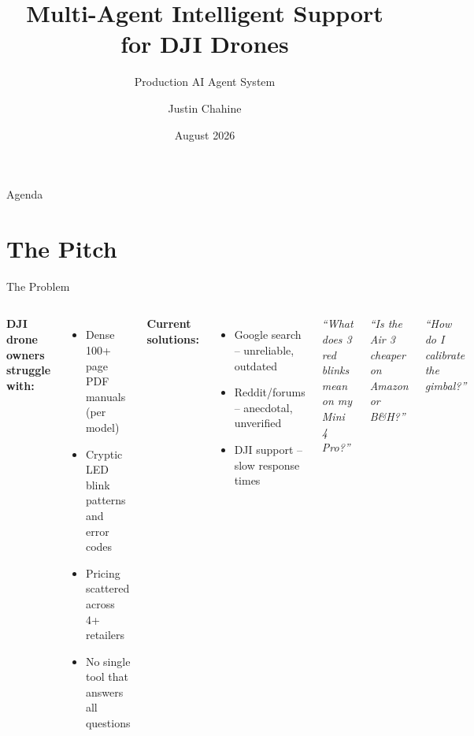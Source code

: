 \documentclass[aspectratio=169]{beamer}
\title[DJI Drone AI Assistant]{\textbf{Multi-Agent Intelligent Support\\for DJI Drones}}
\subtitle{Production AI Agent System}
\author{Justin Chahine}
\institute{InMind AI Program}
\date{August 2026}
\begin{document}
\begin{frame}
\titlepage
\end{frame}

\begin{frame}{Agenda}
\tableofcontents
\end{frame}

\section{The Pitch}

\begin{frame}{The Problem}
\begin{columns}
\textbf{DJI drone owners struggle with:}
\begin{itemize}
  \item Dense 100+ page PDF manuals (per model)
  \item Cryptic LED blink patterns and error codes
  \item Pricing scattered across 4+ retailers
  \item No single tool that answers all questions
\end{itemize}

\vspace{1em}
\textbf{Current solutions:}
\begin{itemize}
  \item Google search -- unreliable, outdated
  \item Reddit/forums -- anecdotal, unverified
  \item DJI support -- slow response times
\end{itemize}

\centering
\vspace{1em}

\small
\textit{``What does 3 red blinks mean on my Mini 4 Pro?''}

\vspace{0.5em}
\textit{``Is the Air 3 cheaper on Amazon or B\&H?''}

\vspace{0.5em}
\textit{``How do I calibrate the gimbal?''}
\end{columns}
\end{frame}
\end{document}
